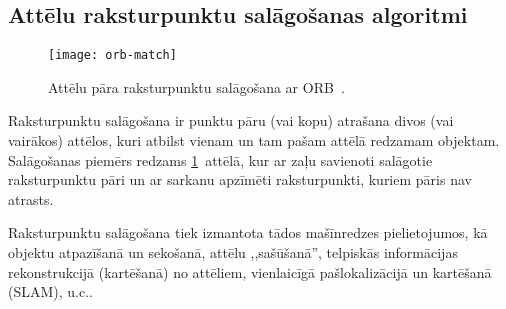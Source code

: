 \subsection{Attēlu raksturpunktu salāgošanas algoritmi} \label{sec:matching}
\begin{figure}[tbh]
	\centering
	\texttt{[image: orb-match]}
	\caption{Attēlu pāra raksturpunktu salāgošana ar ORB~\cite{ORB}.}
	\label{fig:orb}
\end{figure}

Raksturpunktu salāgošana ir punktu pāru (vai kopu) atrašana divos
(vai vairākos) attēlos, kuri atbilst vienam un tam pašam attēlā redzamam
objektam. Salāgošanas piemērs redzams \ref{fig:orb}~attēlā, kur ar zaļu
savienoti salāgotie raksturpunktu pāri un ar sarkanu apzīmēti raksturpunkti,
kuriem pāris nav atrasts.

Raksturpunktu salāgošana tiek izmantota tādos mašīnredzes pielietojumos, kā
objektu atpazīšanā un sekošanā, attēlu ,,sašūšanā'', 
telpiskās informācijas rekonstrukcijā (kartēšanā) no attēliem,
vienlaicīgā pašlokalizācijā un kartēšanā (SLAM), u.c..

\TODO


